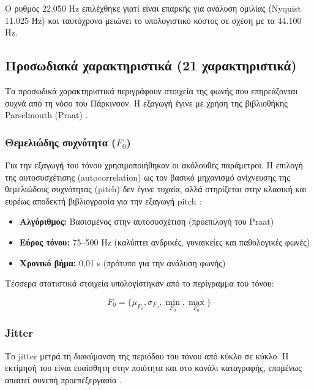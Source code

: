 Ο ρυθμός 22.050 Hz επιλέχθηκε γιατί είναι επαρκής για ανάλυση ομιλίας (Nyquist 11.025 Hz) και ταυτόχρονα μειώνει το υπολογιστικό κόστος σε σχέση με τα 44.100 Hz.

\subsection{Προσωδιακά χαρακτηριστικά (21 χαρακτηριστικά)}

Τα προσωδικά χαρακτηριστικά περιγράφουν στοιχεία της φωνής που επηρεάζονται συχνά από τη νόσο του Πάρκινσον. Η εξαγωγή έγινε με χρήση της βιβλιοθήκης Parselmouth (Praat) \citep{parselmouth2018}.
\subsubsection{Θεμελιώδης συχνότητα (\texorpdfstring{$F_0$}{F0})}

Για την εξαγωγή του τόνου χρησιμοποιήθηκαν οι ακόλουθες παράμετροι. 
Η επιλογή της αυτοσυσχέτισης (autocorrelation) ως τον βασικό μηχανισμό ανίχνευσης της θεμελιώδους συχνότητας (pitch) δεν έγινε τυχαία, αλλά
στηρίζεται στην κλασική και ευρέως αποδεκτή βιβλιογραφία για την εξαγωγή pitch \citep{rabiner1977pitch}:

\begin{itemize}
    \item \textbf{Αλγόριθμος:} Βασισμένος στην αυτοσυσχέτιση (προεπιλογή του Praat)
    \item \textbf{Εύρος τόνου:} 75--500 Hz (καλύπτει ανδρικές, γυναικείες και παθολογικές φωνές)
    \item \textbf{Χρονικό βήμα:} 0,01 s (πρότυπο για την ανάλυση φωνής)
\end{itemize}

Τέσσερα στατιστικά στοιχεία υπολογίστηκαν από το περίγραμμα του τόνου:

\begin{equation}
F_0 = \{\mu_{F_0}, \sigma_{F_0}, \min_{F_0}, \max_{F_0}\}
\label{eq:f0-features}
\end{equation}

\subsubsection{Jitter}

Το \gls{jitter} μετρά τη διακύμανση της περιόδου του τόνου από κύκλο σε κύκλο. Η εκτίμησή του είναι ευαίσθητη στην ποιότητα και στο κανάλι καταγραφής, επομένως απαιτεί συνεπή προεπεξεργασία \citep{gelfer1995jittershimmer}.


